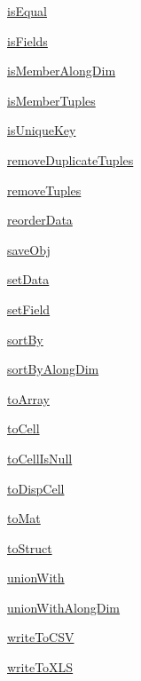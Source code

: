 \begin{list}{}{}
 \item \hyperref[method:smartdb.relations.ATypifiedStaticRelation.isEqual]{isEqual}
 \item \hyperref[method:smartdb.relations.ATypifiedStaticRelation.isFields]{isFields}
 \item \hyperref[method:smartdb.relations.ATypifiedStaticRelation.isMemberAlongDim]{isMemberAlongDim}
 \item \hyperref[method:smartdb.relations.ATypifiedStaticRelation.isMemberTuples]{isMemberTuples}
 \item \hyperref[method:smartdb.relations.ATypifiedStaticRelation.isUniqueKey]{isUniqueKey}
 \item \hyperref[method:smartdb.relations.ATypifiedStaticRelation.removeDuplicateTuples]{removeDuplicateTuples}
 \item \hyperref[method:smartdb.relations.ATypifiedStaticRelation.removeTuples]{removeTuples}
 \item \hyperref[method:smartdb.relations.ATypifiedStaticRelation.reorderData]{reorderData}
 \item \hyperref[method:smartdb.relations.ATypifiedStaticRelation.saveObj]{saveObj}
 \item \hyperref[method:smartdb.relations.ATypifiedStaticRelation.setData]{setData}
 \item \hyperref[method:smartdb.relations.ATypifiedStaticRelation.setField]{setField}
 \item \hyperref[method:smartdb.relations.ATypifiedStaticRelation.sortBy]{sortBy}
 \item \hyperref[method:smartdb.relations.ATypifiedStaticRelation.sortByAlongDim]{sortByAlongDim}
 \item \hyperref[method:smartdb.relations.ATypifiedStaticRelation.toArray]{toArray}
 \item \hyperref[method:smartdb.relations.ATypifiedStaticRelation.toCell]{toCell}
 \item \hyperref[method:smartdb.relations.ATypifiedStaticRelation.toCellIsNull]{toCellIsNull}
 \item \hyperref[method:smartdb.relations.ATypifiedStaticRelation.toDispCell]{toDispCell}
 \item \hyperref[method:smartdb.relations.ATypifiedStaticRelation.toMat]{toMat}
 \item \hyperref[method:smartdb.relations.ATypifiedStaticRelation.toStruct]{toStruct}
 \item \hyperref[method:smartdb.relations.ATypifiedStaticRelation.unionWith]{unionWith}
 \item \hyperref[method:smartdb.relations.ATypifiedStaticRelation.unionWithAlongDim]{unionWithAlongDim}
 \item \hyperref[method:smartdb.relations.ATypifiedStaticRelation.writeToCSV]{writeToCSV}
 \item \hyperref[method:smartdb.relations.ATypifiedStaticRelation.writeToXLS]{writeToXLS}
\end{list}
